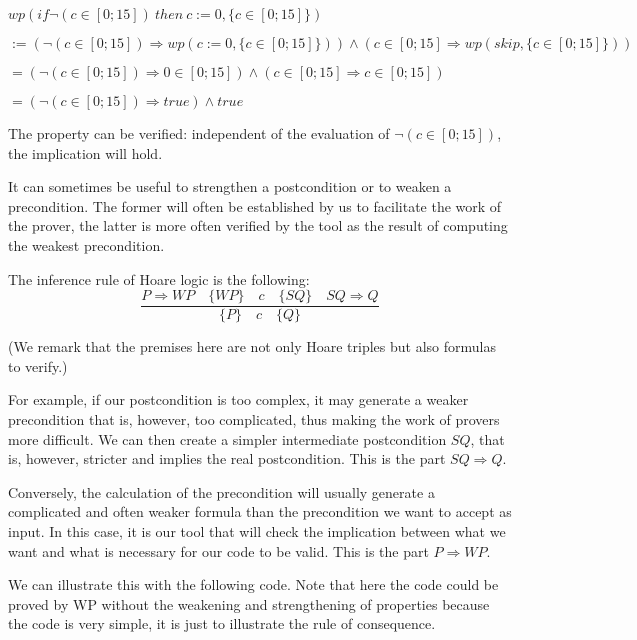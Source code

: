 $wp(if \neg (c \in [0;15])\ then\ c := 0, \{c \in [0;15]\})$



$:= (\neg (c \in [0;15])\Rightarrow wp(c := 0, \{c \in [0;15]\})) \wedge (c \in [0;15]\Rightarrow wp(skip, \{c \in [0;15]\}))$



$= (\neg (c \in [0;15]) \Rightarrow 0 \in [0;15]) \wedge (c \in [0;15] \Rightarrow c \in [0;15])$



$= (\neg (c \in [0;15]) \Rightarrow true) \wedge true$



The property can be verified: independent of the evaluation of
$\neg (c \in [0;15])$, the implication will hold.



\label{l3:statements-basic-consequence}


It can sometimes be useful to strengthen a postcondition or to weaken a
precondition. The former will often be established by us to
facilitate the work of the prover, the latter is more often verified by
the tool as the result of computing the weakest precondition.



The inference rule of Hoare logic is the following:
$$\dfrac{P \Rightarrow WP \quad \{WP\}\quad c\quad \{SQ\} \quad SQ \Rightarrow Q}{\{P\}\quad c \quad \{Q\}}$$

(We remark that the premises here are not only Hoare triples but also
formulas to verify.)

For example, if our postcondition is too complex, it may generate a
weaker precondition that is, however, too complicated, thus making the
work of provers more difficult. We can then create a simpler
intermediate postcondition $SQ$, that is, however, stricter and
implies the real postcondition. This is the part $SQ \Rightarrow Q$.

Conversely, the calculation of the precondition will usually generate a
complicated and often weaker formula than the precondition we want to
accept as input. In this case, it is our tool that will check the
implication between what we want and what is necessary for our code to
be valid. This is the part $P \Rightarrow WP$.

We can illustrate this with the following code. Note that here the code
could be proved by WP without the weakening and strengthening of
properties because the code is very simple, it is just to illustrate the
rule of consequence.



